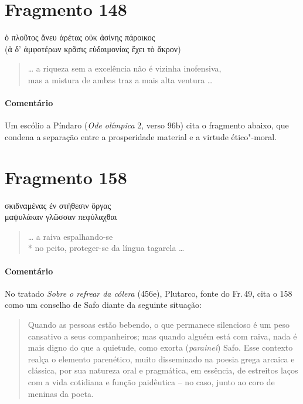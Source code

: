 \section{Fragmento 148}

\begin{gkverse}
ὀ πλοῦτος ἄνευ ἀρέτας οὐκ ἀσίνης πάροικος\\
(ἀ δ’ ἀμφοτέρων κρᾶσις \dagger{}εὐδαιμονίας ἔχει τὸ ἄκρον\dagger{})
\end{gkverse}

\begin{verse}
\ldots{} a riqueza sem a excelência não é vizinha inofensiva,\\
mas a mistura de ambas traz a mais alta ventura \ldots{}
\end{verse}

{\paragraph{Comentário} Um escólio a Píndaro (\textit{Ode olímpica} 2, verso 96b) cita o fragmento abaixo,
que condena a separação entre a prosperidade material e a virtude ético"-moral.}

\pagebreak
\section{Fragmento 158}

\begin{gkverse}
σκιδναμένας ἐν στήθεσιν ὄργας\\
μαψυλάκαν γλῶσσαν πεφύλαχθαι
\end{gkverse}

\begin{verse}
\ldots{} a raiva espalhando-se \\*
no peito, proteger-se da língua tagarela \ldots{}
\end{verse}

{\paragraph{Comentário} No tratado \textit{Sobre o refrear da cólera} (456e), Plutarco, fonte do Fr.\,49, cita o 158 como um conselho de Safo diante da seguinte situação:

\begin{quote}
Quando as pessoas estão bebendo, o que permanece silencioso é um peso
cansativo a seus companheiros; mas quando alguém está com raiva, nada é mais
digno do que a quietude, como exorta (\textit{paraineî}) Safo. Esse contexto realça o elemento parenético, muito disseminado na poesia grega arcaica e clássica, por sua natureza oral e pragmática, em essência, de estreitos laços com a vida cotidiana e função paidêutica -- no caso, junto ao coro de meninas da poeta.
\end{quote}}


